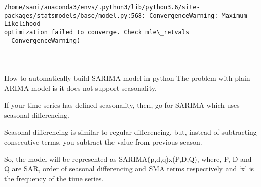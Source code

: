 \documentclass[11pt]{article}
\makeatletter
\newcommand{\boxspacing}{\kern\kvtcb@left@rule\kern\kvtcb@boxsep}
\newcommand{\prompt}[4]{
        \ttfamily\llap{{\color{#2}[#3]:\hspace{3pt}#4}}\vspace{-\baselineskip}
    }
\makeatother
\begin{document}
    \begin{Verbatim}[commandchars=\\\{\}]
/home/sani/anaconda3/envs/.python3/lib/python3.6/site-
packages/statsmodels/base/model.py:568: ConvergenceWarning: Maximum Likelihood
optimization failed to converge. Check mle\_retvals
  ConvergenceWarning)
    \end{Verbatim}

    

    \begin{tcolorbox}[breakable, size=fbox, boxrule=1pt, pad at break*=1mm,colback=cellbackground, colframe=cellborder]
\prompt{In}{incolor}{ }{\boxspacing}
\begin{Verbatim}[commandchars=\\\{\}]

\end{Verbatim}
\end{tcolorbox}

    \begin{tcolorbox}[breakable, size=fbox, boxrule=1pt, pad at break*=1mm,colback=cellbackground, colframe=cellborder]
\prompt{In}{incolor}{ }{\boxspacing}
\begin{Verbatim}[commandchars=\\\{\}]

\end{Verbatim}
\end{tcolorbox}

    \begin{tcolorbox}[breakable, size=fbox, boxrule=1pt, pad at break*=1mm,colback=cellbackground, colframe=cellborder]
\prompt{In}{incolor}{ }{\boxspacing}
\begin{Verbatim}[commandchars=\\\{\}]

\end{Verbatim}
\end{tcolorbox}

    How to automatically build SARIMA model in python The problem with plain
ARIMA model is it does not support seasonality.

If your time series has defined seasonality, then, go for SARIMA which
uses seasonal differencing.

Seasonal differencing is similar to regular differencing, but, instead
of subtracting consecutive terms, you subtract the value from previous
season.

So, the model will be represented as SARIMA(p,d,q)x(P,D,Q), where, P, D
and Q are SAR, order of seasonal differencing and SMA terms respectively
and `x' is the frequency of the time series.
\end{document}
